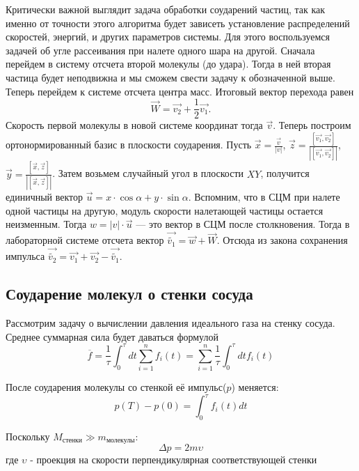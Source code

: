 \documentclass[twoside,twocolumn, 11pt]{article}
\theoremstyle{plain}
\theoremstyle{definition}
\begin{document}
\indent Критически важной выглядит задача обработки соударений частиц, так как именно от точности этого алгоритма будет зависеть установление распределений скоростей, энергий, и других параметров системы.
Для этого воспользуемся задачей об угле рассеивания при налете одного шара на другой.
Сначала перейдем в систему отсчета второй молекулы (до удара). Тогда в ней вторая частица будет неподвижна и мы сможем свести задачу к обозначенной выше. Теперь перейдем к системе отсчета центра масс. Итоговый вектор перехода равен
\begin{equation}
\overrightarrow{W} = \overrightarrow{v_2} + \frac{1}{2}\overrightarrow{v_1}.
\end{equation}
\indent Скорость первой молекулы в новой системе координат тогда $\overrightarrow{v}$.
Теперь построим ортонормированный базис в плоскости соударения. Пусть $\overrightarrow{x} = \frac{\overrightarrow{v}}{|v|}$, $\overrightarrow{z} = \frac{[\overrightarrow{v_1}, \overrightarrow{v_2}]}{|[\overrightarrow{v_1}, \overrightarrow{v_2}]|}$, $\overrightarrow{y} = \frac{[\overrightarrow{x}, \overrightarrow{z}]}{|[\overrightarrow{x}, \overrightarrow{z}]|}$. Затем возьмем случайный угол в плоскости $XY$, получится единичный вектор $\overrightarrow{u} = x \cdot \cos \alpha + y \cdot \sin \alpha$. Вспомним, что в СЦМ при налете одной частицы на другую, модуль скорости налетающей частицы остается неизменным. Тогда $w = |v| \cdot \overrightarrow{u}$ — это вектор в СЦМ после столкновения. Тогда в лабораторной системе отсчета вектор $\overrightarrow{\widetilde{v_1}} = \overrightarrow{w} + \overrightarrow{W}$. Отсюда из закона сохранения импульса $\overrightarrow{\widetilde{v_2}} = \overrightarrow{v_1} + \overrightarrow{v_2} - \overrightarrow{\widetilde{v_1}}$.
\subsection{Соударение молекул о стенки сосуда}
Рассмотрим задачу о вычислении давления идеального газа на стенку сосуда. Среднее суммарная сила будет даваться формулой
\begin{equation}
\overline{f} = \dfrac{1}{\tau} \int_0^\tau dt \sum_{i=1}^n f_i(t) = \sum_{i=1}^n \dfrac{1}{\tau} \int_0^\tau dt f_i(t)
\end{equation}

После соударения молекулы со стенкой её импульс($p$) меняется:
\[p(T) - p(0) = \int_0^\tau f_i(t) dt \]

Поскольку $M_\text{стенки} \gg m_\text{молекулы}$:
\[\Delta p = 2m\upsilon \]где $\upsilon$ - проекция на скорости перпендикулярная соответствующей стенки
\end{document}
